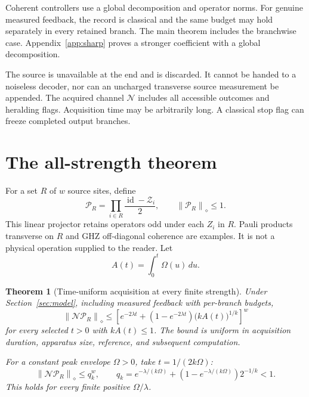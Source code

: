 \documentclass[11pt,a4paper]{article}
\newtheorem{theorem}{Theorem}
\newcommand{\id}{\operatorname{id}}
\newcommand{\norm}[1]{\left\lVert #1\right\rVert}
\newcommand{\Pcal}{\mathcal P}
\newcommand{\Ncal}{\mathcal N}
\newcommand{\Zcal}{\mathcal Z}
\begin{document}
Coherent controllers use a global decomposition and operator norms. For genuine measured feedback, the record is classical and the same budget may hold separately in every retained branch. The main theorem includes the branchwise case. Appendix~\ref{app:sharp} proves a stronger coefficient with a global decomposition.

The source is unavailable at the end and is discarded. It cannot be handed to a noiseless decoder, nor can an uncharged transverse source measurement be appended. The acquired channel $\Ncal$ includes all accessible outcomes and heralding flags. Acquisition time may be arbitrarily long. A classical stop flag can freeze completed output branches.

\section{The all-strength theorem}

For a set $R$ of $w$ source sites, define
\begin{equation}
 \Pcal_R=\prod_{i\in R}\frac{\id-\Zcal_i}{2},\qquad
 \norm{\Pcal_R}_\diamond\le1.
\end{equation}
This linear projector retains operators odd under each $Z_i$ in $R$. Pauli products transverse on $R$ and GHZ off-diagonal coherence are examples. It is not a physical operation supplied to the reader. Let
\begin{equation}
 A(t)=\int_0^t\Omega(u)\,du.
\end{equation}

\begin{theorem}[Time-uniform acquisition at every finite strength]
\label{thm:main}
Under Section~\ref{sec:model}, including measured feedback with per-branch budgets,
\begin{equation}
 \boxed{\norm{\Ncal\Pcal_R}_\diamond
 \le\left[e^{-2\lambda t}+(1-e^{-2\lambda t})\bigl(kA(t)\bigr)^{1/k}\right]^w}
 \label{eq:envelope}
\end{equation}
for every selected $t>0$ with $kA(t)\le1$. The bound is uniform in acquisition duration, apparatus size, reference, and subsequent computation.

For a constant peak envelope $\Omega>0$, take $t=1/(2k\Omega)$:
\begin{equation}
 \boxed{\norm{\Ncal\Pcal_R}_\diamond\le q_k^w,\qquad
 q_k=e^{-\lambda/(k\Omega)}+(1-e^{-\lambda/(k\Omega)})2^{-1/k}<1.}
 \label{eq:q}
\end{equation}
This holds for every finite positive $\Omega/\lambda$.
\end{theorem}
\end{document}
